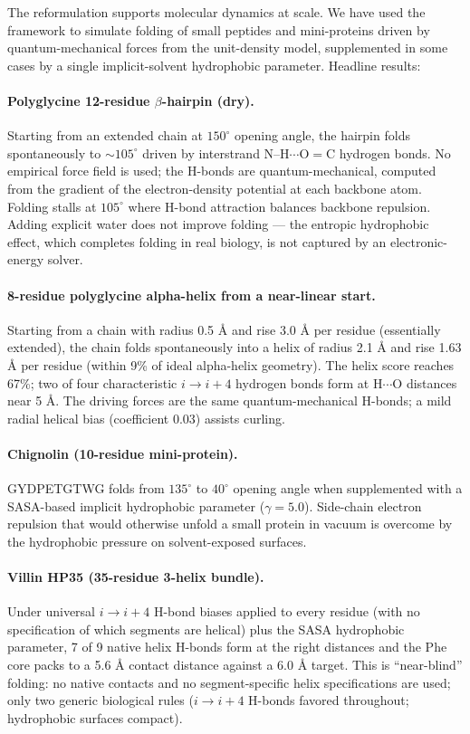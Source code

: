 \documentclass[11pt]{article}
\begin{document}
The reformulation supports molecular dynamics at scale. We have used the framework to simulate folding of small peptides and mini-proteins driven by quantum-mechanical forces from the unit-density model, supplemented in some cases by a single implicit-solvent hydrophobic parameter. Headline results:

\paragraph{Polyglycine 12-residue $\beta$-hairpin (dry).}
Starting from an extended chain at $150^\circ$ opening angle, the hairpin folds spontaneously to ${\sim}105^\circ$ driven by interstrand N--H$\cdots$O$=$C hydrogen bonds. No empirical force field is used; the H-bonds are quantum-mechanical, computed from the gradient of the electron-density potential at each backbone atom. Folding stalls at $105^\circ$ where H-bond attraction balances backbone repulsion. Adding explicit water does not improve folding --- the entropic hydrophobic effect, which completes folding in real biology, is not captured by an electronic-energy solver.

\paragraph{8-residue polyglycine alpha-helix from a near-linear start.}
Starting from a chain with radius 0.5 \AA{} and rise 3.0 \AA{} per residue (essentially extended), the chain folds spontaneously into a helix of radius 2.1 \AA{} and rise 1.63 \AA{} per residue (within 9\% of ideal alpha-helix geometry). The helix score reaches 67\%; two of four characteristic $i \to i{+}4$ hydrogen bonds form at H$\cdots$O distances near 5 \AA. The driving forces are the same quantum-mechanical H-bonds; a mild radial helical bias (coefficient 0.03) assists curling.

\paragraph{Chignolin (10-residue mini-protein).}
GYDPETGTWG folds from $135^\circ$ to $40^\circ$ opening angle when supplemented with a SASA-based implicit hydrophobic parameter ($\gamma = 5.0$). Side-chain electron repulsion that would otherwise unfold a small protein in vacuum is overcome by the hydrophobic pressure on solvent-exposed surfaces.

\paragraph{Villin HP35 (35-residue 3-helix bundle).}
Under universal $i \to i{+}4$ H-bond biases applied to every residue (with no specification of which segments are helical) plus the SASA hydrophobic parameter, 7 of 9 native helix H-bonds form at the right distances and the Phe core packs to a 5.6 \AA{} contact distance against a 6.0 \AA{} target. This is ``near-blind'' folding: no native contacts and no segment-specific helix specifications are used; only two generic biological rules ($i \to i{+}4$ H-bonds favored throughout; hydrophobic surfaces compact).
\end{document}
